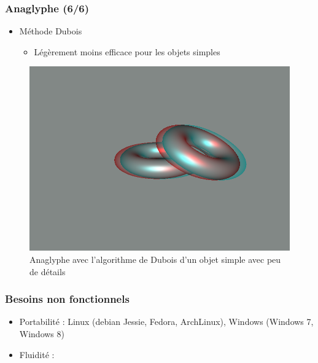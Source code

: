 \documentclass{beamer}
\begin{document}
%
% 
\begin{frame}
\frametitle{Anaglyphe (6/6)}
\begin{itemize}[label=$\bullet$]
\item Méthode Dubois \cite{algoDubois}
	\begin{itemize}[label=$\circ$]
	\item Légèrement moins efficace pour les objets simples 
	\end{itemize}
\end{itemize}
\begin{figure}
\centering
\includegraphics[scale=0.35]{donuts_dubois.png}
\caption{Anaglyphe avec l'algorithme de Dubois d'un objet simple avec peu de détails}
\end{figure}
\end{frame}

\begin{frame}
\frametitle{Besoins non fonctionnels}
\begin{itemize}[label=$\bullet$]
 	\item Portabilité : Linux (debian Jessie, Fedora, ArchLinux), Windows (Windows 7, Windows 8)
	\item Fluidité : 
\end{itemize}

\end{frame}

\end{document}
